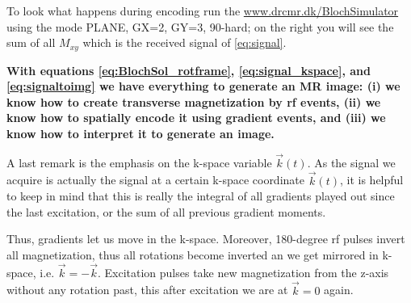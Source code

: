 \documentclass[a4paper,12pt]{extarticle}
\begin{document}
 To look what happens during encoding run the  \href{http://www.drcmr.dk/BlochSimulator/}{www.drcmr.dk/BlochSimulator} using the mode PLANE, GX=2, GY=3, 90-hard; on the right you will see the sum of all $M_{xy}$ which is the received signal of \eqref{eq:signal}.
 
 
 \textbf{With equations \eqref{eq:BlochSol_rotframe}, \eqref{eq:signal_kspace}, and \eqref{eq:signaltoimg} we have everything to generate an MR image: (i) we know how to create transverse magnetization by rf events, (ii) we know how to spatially encode it using gradient events, and (iii) we know how to interpret it to generate an image.}

 A last remark is the emphasis on the k-space variable  $\vec{k}(t)$. As the signal we acquire is actually the signal at a certain k-space coordinate $\vec{k}(t)$, it is helpful to keep in mind that this is really the integral of all gradients played out since the last excitation, or the sum of all previous gradient moments.

Thus, gradients let us move in the k-space. Moreover, 180-degree rf pulses invert all magnetization, thus all rotations become inverted an we get mirrored in k-space, i.e. $\vec{k}=-\vec{k}$.
Excitation pulses take new magnetization from the z-axis without any rotation past, this after excitation we are at $\vec{k}=0$ again.
  
  \newpage
 
\end{document}
